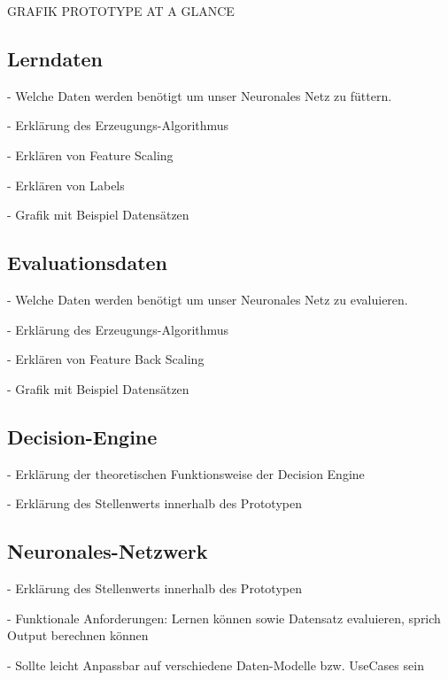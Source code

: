 GRAFIK PROTOTYPE AT A GLANCE

\subsection{Lerndaten}
\label{subsec:Lerndaten3}

- Welche Daten werden benötigt um unser Neuronales Netz zu füttern.

- Erklärung des Erzeugungs-Algorithmus 

- Erklären von Feature Scaling

- Erklären von Labels

- Grafik mit Beispiel Datensätzen

\subsection{Evaluationsdaten}
\label{subsec:Evaluationsdaten3}

- Welche Daten werden benötigt um unser Neuronales Netz zu evaluieren.

- Erklärung des Erzeugungs-Algorithmus 

- Erklären von Feature Back Scaling

- Grafik mit Beispiel Datensätzen

\subsection{Decision-Engine}
\label{subsec:Engine3}

- Erklärung der theoretischen Funktionsweise der Decision Engine

- Erklärung des Stellenwerts innerhalb des Prototypen

\subsection{Neuronales-Netzwerk}
- Erklärung des Stellenwerts innerhalb des Prototypen 

- Funktionale Anforderungen: Lernen können sowie Datensatz evaluieren, sprich Output berechnen können

- Sollte leicht Anpassbar auf verschiedene Daten-Modelle bzw. UseCases sein 

